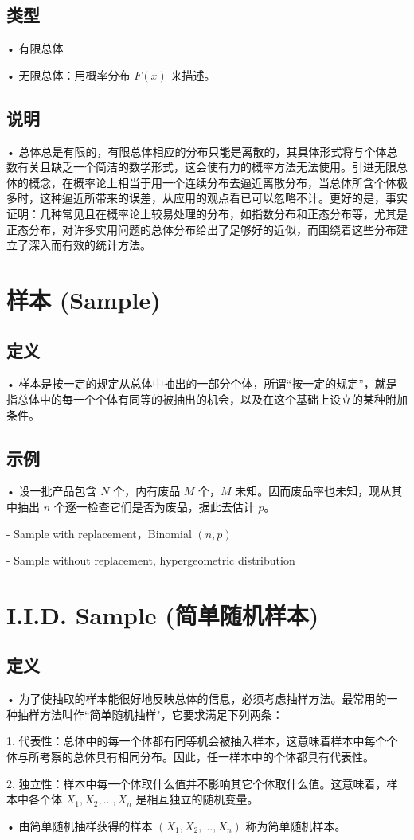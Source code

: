 \documentclass[UTF8]{report}
\theoremstyle{MyLineTheoremStyle} %
\theoremstyle{MyBlockTheoremStyle} %
\theoremstyle{MySubsubsectionStyle} %
\begin{document}
\subsection{类型}
• 有限总体\par
• 无限总体：用概率分布 $F(x)$ 来描述。
\subsection{说明}
• 总体总是有限的，有限总体相应的分布只能是离散的，其具体形式将与个体总数有关且缺乏一个简洁的数学形式，这会使有力的概率方法无法使用。引进无限总体的概念，在概率论上相当于用一个连续分布去逼近离散分布，当总体所含个体极多时，这种逼近所带来的误差，从应用的观点看已可以忽略不计。更好的是，事实证明：几种常见且在概率论上较易处理的分布，如指数分布和正态分布等，尤其是正态分布，对许多实用问题的总体分布给出了足够好的近似，而围绕着这些分布建立了深入而有效的统计方法。

\section{样本 (Sample)}
\subsection{定义}
• 样本是按一定的规定从总体中抽出的一部分个体，所谓“按一定的规定”，就是指总体中的每一个个体有同等的被抽出的机会，以及在这个基础上设立的某种附加条件。
\subsection{示例}
• 设一批产品包含 $N$ 个，内有废品 $M$ 个，$M$ 未知。因而废品率也未知，现从其中抽出 $n$ 个逐一检查它们是否为废品，据此去估计 $p$。\par
  - Sample with replacement，Binomial $(n, p)$\par
  - Sample without replacement, hypergeometric distribution\par

\section{I.I.D. Sample (简单随机样本)}
\subsection{定义}
• 为了使抽取的样本能很好地反映总体的信息，必须考虑抽样方法。最常用的一种抽样方法叫作“简单随机抽样"，它要求满足下列两条：\par
  1. 代表性：总体中的每一个体都有同等机会被抽入样本，这意味着样本中每个个体与所考察的总体具有相同分布。因此，任一样本中的个体都具有代表性。\par
  2. 独立性：样本中每一个体取什么值并不影响其它个体取什么值。这意味着，样本中各个体 $X_1, X_2, \ldots, X_n$ 是相互独立的随机变量。\par
• 由简单随机抽样获得的样本 $(X_1, X_2, \ldots, X_n)$ 称为简单随机样本。\par
\end{document}
